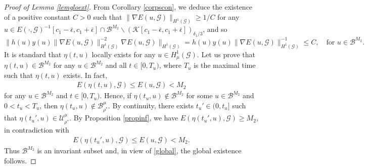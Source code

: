 \documentclass[10pt,a4paper]{article}
\theoremstyle{definition} \theoremstyle{remark}
\numberwithin{equation}{section}
\newcommand{\G}{\mathcal{G}}
\newcommand{\B}{\mathcal{B}}
\newcommand{\U}{\mathcal{U}}
\begin{document}
\begin{proof}[Proof of Lemma \ref{lemgloext}]
From Corollary \ref{corpscon}, we deduce the existence of a positive constant $C > 0$ such that $\|\nabla E(u,\G)\|_{H^1(\G)} \geq 1/C$ for any $u \in  E(\cdot,\G)^{-1}[c_1- \bar{\epsilon}, c_1 + \bar{\epsilon}] \cap \B^{M_2} \backslash (\mathcal{K}[c_1-\bar{\epsilon},c_1+\bar{\epsilon}])_{\delta_1/3}$, and so 
\begin{equation}\label{global}
\|h(u)y(u)\|\nabla E(u,\G)\|_{H^1(\G)}^{-2}\nabla E(u,\G)\|_{H^1(\G)} = h(u)y(u)\|\nabla E(u,\G)\|_{H^1(\G)}^{-1} \leq C, \quad \text{for } u \in \B^{M_2}.
\end{equation}
It is standard that $\eta(t,u)$ locally exists for any $u \in H^1_\mu(\G)$.
Let us prove that $\eta(t,u) \in \B^{M_2}$ for any $u \in \B^{M_2}$ and all $t \in [0,T_u)$, where $T_u$ is the maximal time such that $\eta(t,u)$ exists. In fact,
	\begin{align*}
		E(\eta(t,u),\G) \leq E(u,\G) < M_2
	\end{align*}
	for any $u \in \B^{M_2}$ and $t \in [0,T_u)$. Hence, if $\eta(t_u,u) \notin \B^{M_2}$ for some $u \in \B^{M_2}$ and $0 < t_u < T_u$, then $\eta(t_u,u) \notin \B_{\rho^*}^\mu$. By continuity, there exists $t_u' \in (0,t_u]$ such that $\eta(t_u',u) \in \U_{\rho^*}^\mu$. By Proposition \ref{propinf}, we have $E(\eta(t_u',u),\G) \geq M_2$, in contradiction with
	\begin{align*}
		E(\eta(t_u',u),\G) \leq E(u,\G) < M_2.
	\end{align*}
	Thus $\B^{M_2}$ is an invariant subset and, in view of \eqref{global}, the global existence follows.
    
\end{proof}
\end{document}
